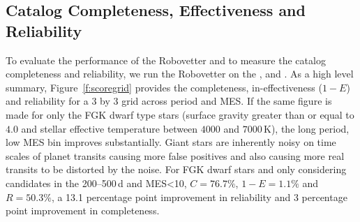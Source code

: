 \subsection{Catalog Completeness, Effectiveness and Reliability}
\label{s:candr}

To evaluate the performance of the Robovetter and to measure the catalog completeness and reliability, we run the Robovetter on the ,  and . As a high level summary, Figure~\ref{f:scoregrid} provides the completeness, in-effectiveness ($1-E$) and reliability for a 3 by 3 grid across period and MES. If the same figure is made for only the FGK dwarf type stars (surface gravity greater than or equal to $4.0$ and stellar effective temperature between $4000$ and $7000$\,K), the long period, low MES bin improves substantially. Giant stars are inherently noisy on time scales of planet transits \citep[see Figure~9 of][]{Christiansen2012} causing more false positives and also causing more real transits to be distorted by the noise. For FGK dwarf stars and only considering candidates in the 200--500\,d and MES<10, $C=76.7\%$, $1-E=1.1\%$ and $R=50.3\%$, a 13.1 percentage point improvement in reliability and 3 percentage point improvement in completeness. 

